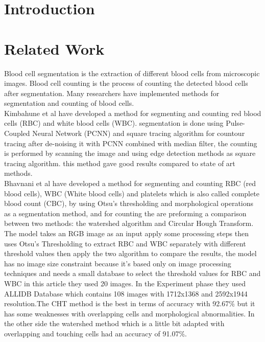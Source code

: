 \section{Introduction}
\vspace{0.2in}
\hspace*{0.16in}

\section{Related Work}
\vspace{0.2in}
\hspace*{0.16in}
Blood cell segmentation is the extraction of different blood cells from microscopic images. Blood cell counting is the process of counting the detected blood cells after segmentation. Many researchers have implemented methods for segmentation and counting of blood cells.\\

Kimbahune et al \textsuperscript{\cite{kimbahune2011blood}} have developed a method for segmenting and counting red blood cells (RBC) and white blood cells (WBC).
segmentation is done using Pulse-Coupled Neural Network (PCNN) and square tracing algorithm for countour tracing after de-noising it with PCNN combined with median filter, the counting is performed by scanning the image and using edge detection methods as square tracing algorithm. this method gave good results compared to state of art methods.\\

Bhavnani et al \textsuperscript{\cite{bhavnani2016segmentation}} have developed a method for segmenting and counting RBC (red blood cells), WBC (White blood cells) and platelets which is also called complete blood count (CBC), by using Otsu’s thresholding and morphological operations as a segmentation method, and for counting the are preforming a comparison between two methods: the watershed algorithm and Circular Hough Transform. The model takes an RGB image as an input apply some processing steps then uses Otsu's Thresholding to extract RBC and WBC separately with different threshold values then apply the two algorithm to compare the results, the model has no image size constraint because it's based only on image processing techniques and needs a small database to select the threshold values for RBC and WBC in this article they used 20 images. In the Experiment phase they used ALLIDB Database which contains 108 images with 1712x1368 and 2592x1944 resolution.The CHT method is the best in terms of accuracy with 92.67\% but it has some weaknesses with overlapping cells and morphological abnormalities. In the other side the watershed method which is a little bit adapted with overlapping and touching cells had an accuracy of 91.07\%.\\

